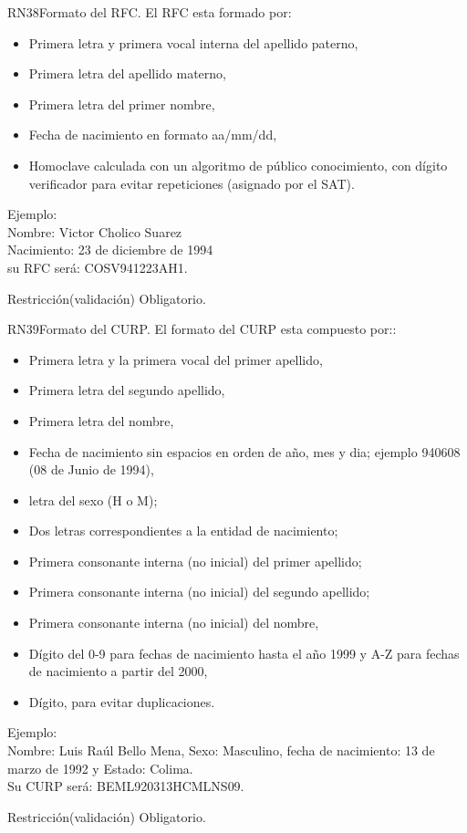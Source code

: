 \begin{BussinesRule}{RN38}{Formato del RFC.}
	\BRitem[Descripción:] El RFC esta formado por:
		\begin{itemize}
			\item Primera letra y primera vocal interna del apellido paterno,
			\item Primera letra del apellido materno,
			\item Primera letra del primer nombre,
			\item Fecha de nacimiento en formato aa/mm/dd,
			\item Homoclave calculada con un algoritmo de público conocimiento, con dígito verificador para evitar repeticiones (asignado por el SAT).				
		\end{itemize}

Ejemplo:\\
Nombre: Victor Cholico Suarez \\
Nacimiento: 23 de diciembre de 1994 \\
su RFC será: COSV941223AH1.


	\BRitem[Tipo:] Restricción(validación)
	\BRitem[Nivel:] Obligatorio.
\end{BussinesRule}

\begin{BussinesRule}{RN39}{Formato del CURP.}
	\BRitem[Descripción:] El formato del CURP esta compuesto por::
		\begin{itemize}
			\item Primera letra y la primera vocal del primer apellido,
			\item Primera letra del segundo apellido,
			\item Primera letra del nombre,
			\item Fecha de nacimiento sin espacios en orden de año, mes y dia; ejemplo 940608 (08 de Junio de 1994),
			\item letra del sexo (H o M);
			\item Dos letras correspondientes a la entidad de nacimiento;
			\item Primera consonante interna (no inicial) del primer apellido;
			\item Primera consonante interna (no inicial) del segundo apellido;
			\item Primera consonante interna (no inicial) del nombre,
			\item Dígito del 0-9 para fechas de nacimiento hasta el año 1999 y A-Z para fechas de nacimiento a partir del 2000,
			\item Dígito, para evitar duplicaciones.			
		\end{itemize}

Ejemplo:\\
Nombre: Luis Raúl Bello Mena, Sexo: Masculino, fecha de nacimiento: 13 de marzo de 1992 y Estado: Colima.\\
Su CURP será: BEML920313HCMLNS09.

	\BRitem[Tipo:] Restricción(validación)
	\BRitem[Nivel:] Obligatorio.
\end{BussinesRule}


